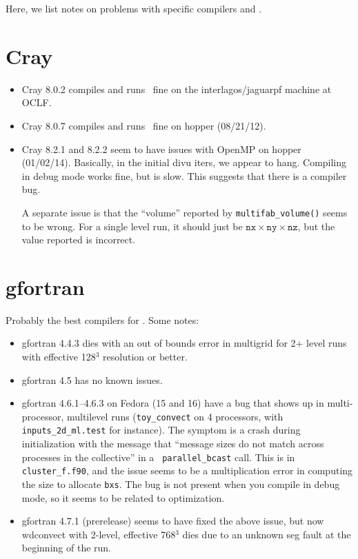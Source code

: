 Here, we list notes on problems with specific compilers and \maestro.


\section{Cray}

\begin{itemize}
\item Cray 8.0.2 compiles and runs \maestro\ fine on the interlagos/jaguarpf 
machine at OCLF.
\item Cray 8.0.7 compiles and runs \maestro\ fine on hopper (08/21/12).
\item Cray 8.2.1 and 8.2.2 seem to have issues with OpenMP on hopper (01/02/14).  Basically, in the initial divu iters, we appear to hang.  Compiling in debug mode works fine, but is slow.  This suggests that there is a compiler bug.
 
 A separate issue is that the ``volume'' reported by {\tt multifab\_volume()}
 seems to be wrong.  For a single level run, it should just be $\mathtt{nx} \times \mathtt{ny} \times \mathtt{nz}$, but the value reported is incorrect.
\end{itemize}


\section{gfortran}

Probably the best compilers for \maestro.  
Some notes:
\begin{itemize}
\item gfortran 4.4.3 dies with an out of bounds error in multigrid for
2+ level runs with effective 128$^3$ resolution or better.
\item gfortran 4.5 has no known issues.
\item gfortran 4.6.1--4.6.3 on Fedora (15 and 16) have a bug that 
shows up in multi-processor, multilevel runs ({\tt toy\_convect} on 4
processors, with {\tt inputs\_2d\_ml.test} for instance).  The symptom
is a crash during initialization with the message that ``message sizes
do not match across processes in the collective'' in a {\tt
parallel\_bcast} call.  This is in {\tt cluster\_f.f90}, and the issue
seems to be a multiplication error in computing the size to allocate
{\tt bxs}.  The bug is not present when you compile in debug mode, so
it seems to be related to optimization.
\item gfortran 4.7.1 (prerelease) seems to have fixed the above issue,
but now wdconvect with 2-level, effective 768$^3$ dies due to an
unknown seg fault at the beginning of the run.
\end{itemize}

